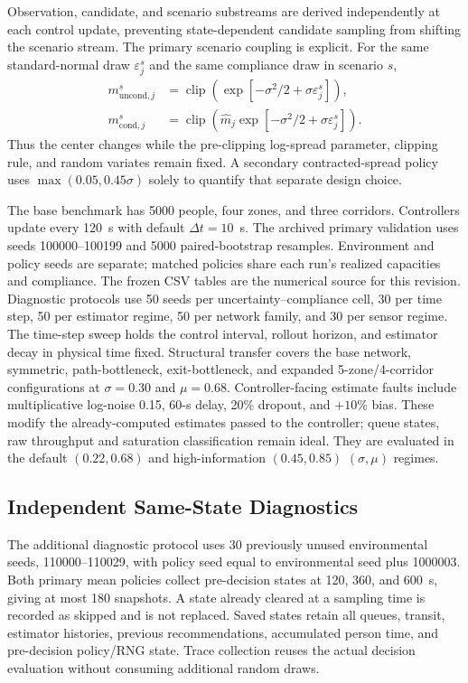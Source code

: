 \documentclass[conference]{IEEEtran}
\newcommand{\cond}{\mathrm{cond}}
\newcommand{\uncond}{\mathrm{uncond}}
\begin{document}
Observation, candidate, and scenario substreams are derived independently at each control update, preventing state-dependent candidate sampling from shifting the scenario stream. The primary scenario coupling is explicit. For the same standard-normal draw $\varepsilon_j^s$ and the same compliance draw in scenario $s$,
\begin{align}
m_{\uncond,j}^s&=\operatorname{clip}\!\left(\exp[-\sigma^2/2+\sigma\varepsilon_j^s]\right),\\
m_{\cond,j}^s&=\operatorname{clip}\!\left(\widehat m_j\exp[-\sigma^2/2+\sigma\varepsilon_j^s]\right).
\label{eq:center-only}
\end{align}
Thus the center changes while the pre-clipping log-spread parameter, clipping rule, and random variates remain fixed. A secondary contracted-spread policy uses $\max(0.05,0.45\sigma)$ solely to quantify that separate design choice.

The base benchmark has 5000 people, four zones, and three corridors. Controllers update every 120~s with default $\Delta t=10$~s. The archived primary validation uses seeds 100000--100199 and 5000 paired-bootstrap resamples. Environment and policy seeds are separate; matched policies share each run's realized capacities and compliance. The frozen CSV tables are the numerical source for this revision. Diagnostic protocols use 50 seeds per uncertainty--compliance cell, 30 per time step, 50 per estimator regime, 50 per network family, and 30 per sensor regime. The time-step sweep holds the control interval, rollout horizon, and estimator decay in physical time fixed. Structural transfer covers the base network, symmetric, path-bottleneck, exit-bottleneck, and expanded 5-zone/4-corridor configurations at $\sigma=0.30$ and $\mu=0.68$. Controller-facing estimate faults include multiplicative log-noise 0.15, 60-s delay, 20\% dropout, and $+10\%$ bias. These modify the already-computed estimates passed to the controller; queue states, raw throughput and saturation classification remain ideal. They are evaluated in the default $(0.22,0.68)$ and high-information $(0.45,0.85)$ $(\sigma,\mu)$ regimes.

\subsection{Independent Same-State Diagnostics}
The additional diagnostic protocol uses 30 previously unused environmental seeds, 110000--110029, with policy seed equal to environmental seed plus 1000003. Both primary mean policies collect pre-decision states at 120, 360, and 600~s, giving at most 180 snapshots. A state already cleared at a sampling time is recorded as skipped and is not replaced. Saved states retain all queues, transit, estimator histories, previous recommendations, accumulated person time, and pre-decision policy/RNG state. Trace collection reuses the actual decision evaluation without consuming additional random draws.
\end{document}
